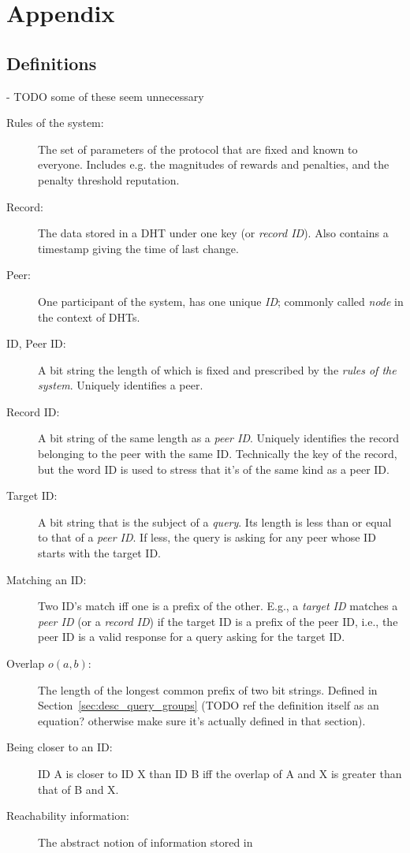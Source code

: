 \chapter{Appendix}
\section{Definitions}
- TODO some of these seem unnecessary

\begin{description}
\item[Rules of the system:] The set of parameters of the protocol that are fixed
and known to everyone. Includes e.g. the magnitudes of rewards and penalties,
and the penalty threshold reputation.
\item[Record:] The data stored in a \ac{DHT} under one key (or \emph{record
ID}). Also contains a timestamp giving the time of last change.
\item[Peer:] One participant of the system, has one unique \emph{ID}; commonly
called \emph{node} in the context of \acp{DHT}.
\item[ID, Peer ID:] A bit string the length of which is fixed and prescribed by
the \emph{rules of the system}. Uniquely identifies a peer.
\item[Record ID:] A bit string of the same length as a \emph{peer ID}. Uniquely
identifies the record belonging to the peer with the same ID. Technically the
key of the record, but the word ID is used to stress that it's of the same kind
as a peer ID.
\item[Target ID:] A bit string that is the subject of a \emph{query}. Its length
is less than or equal to that of a \emph{peer ID}. If less, the query is asking
for any peer whose ID starts with the target ID.
\item[Matching an ID:] Two ID's match iff one is a prefix of the other. E.g., a
\emph{target ID} matches a \emph{peer ID} (or a \emph{record ID}) if the target
ID is a prefix of the peer ID, i.e., the peer ID is a valid response for a query
asking for the target ID.
\item[Overlap $o(a, b)$:] The length of the longest common prefix of two bit
strings. Defined in Section~\ref{sec:desc_query_groups} (TODO ref the
definition itself as an equation? otherwise make sure it's actually defined in
that section).
\item[Being closer to an ID:] ID A is closer to ID X than ID B iff the overlap
of A and X is greater than that of B and X.
\item[Reachability information:] The abstract notion of information stored in

\end{description}
